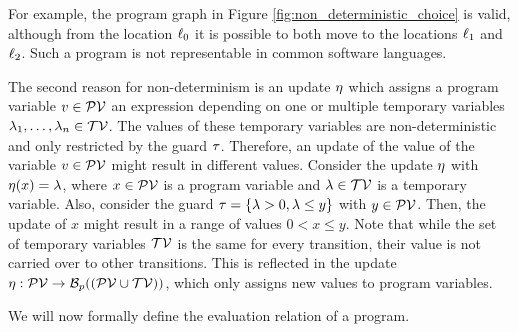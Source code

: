 

For example, the program graph in Figure \ref{fig:non_deterministic_choice} is valid, although from the location $\ell_0$ it is possible to both move to the locations $\ell_1$ and $\ell_2$.
Such a program is not representable in common software languages.

The second reason for non-determinism is an update $\eta$ which assigns a program variable $v \in \mathcal{PV}$ an expression depending on one or multiple temporary variables $\lambda_1, \dots, \lambda_n \in \mathcal{TV}$.
The values of these temporary variables are non-deterministic and only restricted by the guard $\tau$.
Therefore, an update of the value of the variable $v \in \mathcal{PV}$ might result in different values.
Consider the update $\eta$ with $\eta(x) = \lambda$, where $x \in \mathcal{PV}$ is a program variable and $\lambda \in \mathcal{TV}$ is a temporary variable.
Also, consider the guard $\tau = \lbrace \lambda > 0, \lambda \leq y \rbrace$ with $y \in \mathcal{PV}$.
Then, the update of $x$ might result in a range of values $0 < x \leq y$. 
Note that while the set of temporary variables $\mathcal{TV}$ is the same for every transition, their value is not carried over to other transitions.
This is reflected in the update $\eta: \mathcal{PV} \rightarrow \mathcal{B}_p((\mathcal{PV} \cup \mathcal{TV}))$, which only assigns new values to program variables.

We will now formally define the evaluation relation of a program.

